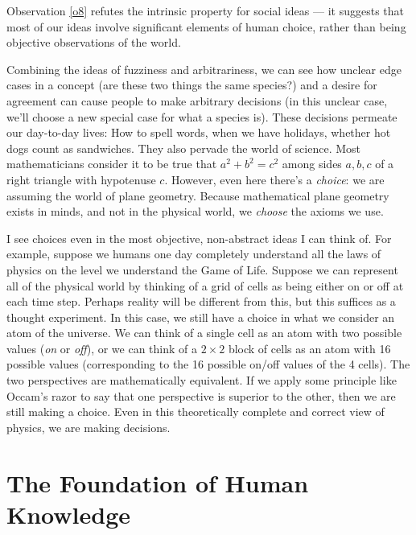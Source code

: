 \documentclass[9pt, twoside]{book}
\theoremstyle{argtstyle}
\begin{document}
Observation \ref{o8} refutes the intrinsic property for social ideas --- it
suggests that most of our ideas involve significant elements of human choice,
rather than being objective observations of the world.


Combining the ideas of fuzziness and arbitrariness, we can see how unclear edge
cases in a concept (are these two things the same species?)
and a desire for agreement
can cause people to make arbitrary decisions
(in this unclear case, we'll choose a new special case for
what a species is).
These decisions permeate our day-to-day lives: How to spell words,
when we have holidays,
whether hot dogs count as sandwiches.
They also pervade the world of science.
Most mathematicians consider it to be true that $a^2+b^2=c^2$ among sides
$a,b,c$ of a right triangle with hypotenuse $c$. However, even here there's
a {\em choice}\/: we are assuming the world of plane geometry. Because
mathematical plane geometry exists in minds, and not in the physical world,
we {\em choose} the axioms we use.

I see choices
even in the most objective, non-abstract ideas I can think of.
For example, suppose we humans one day completely understand all
the laws of physics on the level we understand the Game of Life.
Suppose we can represent all of the physical world by thinking of a grid of
cells as being either on or off at each time step.
Perhaps reality will be
different from this, but this suffices as a thought experiment.
In this case, we still have a choice in what we consider an atom of the
universe. We can think of a single cell as an atom with two possible values
({\em on} or {\em off}\/), or we can think of a $2\times 2$
block of cells as an atom with 16 possible values (corresponding to the 16
possible on/off values of the 4 cells). The two perspectives are mathematically
equivalent. If we apply some principle like Occam's razor to say
that one perspective is superior
to the other, then we are still making a choice. Even in this theoretically
complete and correct view of physics, we are making decisions.

\chapter{The Foundation of Human Knowledge}\label{s7}

\end{document}
